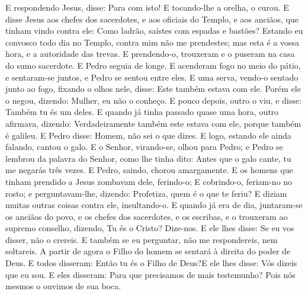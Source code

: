 {  E respondendo Jesus, disse: Para com isto! E tocando-lhe a orelha, o curou.
  E disse Jesus aos chefes dos sacerdotes, e aos oficiais do Templo, e aos anciãos, que tinham vindo contra ele: Como
{} ladrão, saístes com espadas e bastões?
  Estando eu convosco todo dia no Templo, contra mim não me prendestes; mas esta é a vossa hora, e
{} a autoridade das trevas.
  E prendendo-o,
{} trouxeram e o puseram na casa do sumo sacerdote. E Pedro
{} seguia de longe.
  E acenderam fogo no meio do pátio, e sentaram-se juntos, e Pedro se sentou entre eles.
  E uma serva, vendo-o sentado junto ao fogo, fixando o olhos nele, disse: Este também estava com ele.
  Porém ele o negou, dizendo: Mulher, eu não o conheço.
  E pouco depois, outro o viu, e disse: Também tu és um deles.
  E quando já tinha passado quase uma hora, outro afirmava, dizendo: Verdadeiramente também este estava com ele, porque também é galileu.
  E Pedro disse: Homem, não sei o que dizes. E logo, estando ele ainda falando, cantou o galo.
  E o Senhor, virando-se, olhou para Pedro; e Pedro se lembrou da palavra do Senhor, como lhe tinha dito: Antes que o galo cante, tu me negarás três vezes.
  E Pedro, saindo, chorou amargamente.
  E os homens que tinham prendido a Jesus zombavam dele, ferindo-o;
  E cobrindo-o, feriam-no no rosto; e perguntavam-lhe, dizendo: Profetiza, quem é o que te feriu?
  E diziam muitas outras coisas contra ele, insultando-o.
  E quando já era de dia, juntaram-se os anciãos do povo, e os chefes dos sacerdotes, e os escribas, e o trouxeram ao supremo conselho,
  dizendo, Tu és o Cristo? Dize-nos. E ele lhes disse: Se eu vos disser, não o crereis.
  E também se eu perguntar, não me respondereis, nem
{} soltareis.
  A partir de agora o Filho do homem se sentará à direita do poder de Deus.
  E todos disseram: Então tu és o Filho de Deus?E ele lhes disse: Vós dizeis que eu sou.
  E eles disseram: Para que precisamos de mais testemunho? Pois nós mesmos o ouvimos de sua boca.
\par }

